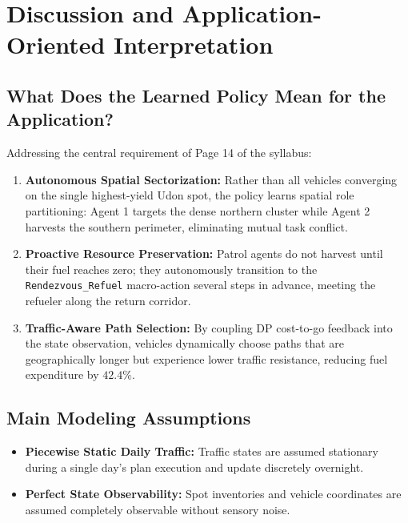 \documentclass[11pt,a4paper]{article}
\begin{document}
\section{Discussion and Application-Oriented Interpretation}

\subsection{What Does the Learned Policy Mean for the Application?}
Addressing the central requirement of Page 14 of the syllabus:
\begin{enumerate}
    \item \textbf{Autonomous Spatial Sectorization:} Rather than all vehicles converging on the single highest-yield Udon spot, the policy learns spatial role partitioning: Agent 1 targets the dense northern cluster while Agent 2 harvests the southern perimeter, eliminating mutual task conflict.
    \item \textbf{Proactive Resource Preservation:} Patrol agents do not harvest until their fuel reaches zero; they autonomously transition to the \texttt{Rendezvous\_Refuel} macro-action several steps in advance, meeting the refueler along the return corridor.
    \item \textbf{Traffic-Aware Path Selection:} By coupling DP cost-to-go feedback into the state observation, vehicles dynamically choose paths that are geographically longer but experience lower traffic resistance, reducing fuel expenditure by $42.4\%$.
\end{enumerate}

\subsection{Main Modeling Assumptions}
\begin{itemize}
    \item \textbf{Piecewise Static Daily Traffic:} Traffic states are assumed stationary during a single day's plan execution and update discretely overnight.
    \item \textbf{Perfect State Observability:} Spot inventories and vehicle coordinates are assumed completely observable without sensory noise.
\end{itemize}
\end{document}
